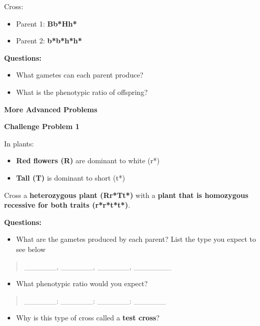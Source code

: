 \documentclass[
  letterpaper,
  DIV=11,
  numbers=noendperiod]{scrreprt}
\providecommand{\tightlist}{%
  \setlength{\itemsep}{0pt}\setlength{\parskip}{0pt}}
\begin{document}
Cross:

\begin{itemize}
\item
  Parent 1: \textbf{Bb*Hh*}
\item
  Parent 2: \textbf{b*b*h*h*}
\end{itemize}

\textbf{Questions:}

\begin{itemize}
\item
  What gametes can each parent produce?
\item
  What is the phenotypic ratio of offspring?
\end{itemize}

\textbf{More Advanced Problems}

\textbf{Challenge Problem 1}

In plants:

\begin{itemize}
\item
  \textbf{Red flowers (R)} are dominant to white (r*)
\item
  \textbf{Tall (T)} is dominant to short (t*)
\end{itemize}

Cross a \textbf{heterozygous plant (Rr*Tt*)} with a \textbf{plant that
is homozygous recessive for both traits (r*r*t*t*)}.

\textbf{Questions:}

\begin{itemize}
\tightlist
\item
  What are the gametes produced by each parent? List the type you expect
  to see below
\end{itemize}

\begin{quote}
\_\_\_\_\_\_, \_\_\_\_\_\_, \_\_\_\_\_\_, \_\_\_\_\_\_\_
\end{quote}

\begin{itemize}
\tightlist
\item
  What phenotypic ratio would you expect?
\end{itemize}

\begin{quote}
\_\_\_\_\_\_: \_\_\_\_\_\_: \_\_\_\_\_\_: \_\_\_\_\_\_
\end{quote}

\begin{itemize}
\tightlist
\item
  Why is this type of cross called a \textbf{test cross}?
\end{itemize}
\end{document}
